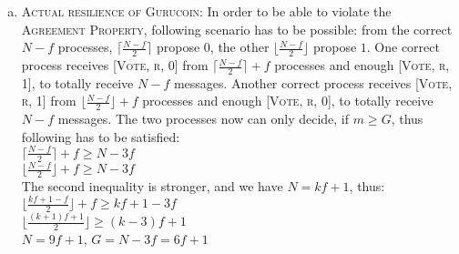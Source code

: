 \documentclass{article}
\begin{document}
\begin{enumerate}[a)]
        \item \textsc{Actual resilience of Gurucoin:}
        In order to be able to violate the \textsc{Agreement Property}, following scenario has to be possible:
        from the correct $N - f$ processes, $\lceil  \frac{N - f}{2} \rceil$ propose $0$, the other $\lfloor \frac{N - f}{2} \rfloor$ propose $1$.
        One correct process receives \textsc{[Vote, r, 0]} from $\lceil  \frac{N - f}{2} \rceil + f$ processes and enough \textsc{[Vote, r, 1]}, to totally receive $N - f$ messages.
        Another correct process receives \textsc{[Vote, r, 1]} from $\lfloor  \frac{N - f}{2} \rfloor + f$ processes and enough \textsc{[Vote, r, 0]}, to totally receive $N - f$ messages.
        The two processes now can only decide, if $m \geq G$, thus following has to be satisfied:\\
        $\lceil  \frac{N - f}{2} \rceil + f \geq N - 3f$\\
        $\lfloor  \frac{N - f}{2} \rfloor + f \geq N - 3f$\\
        The second inequality is stronger, and we have $N = kf + 1$, thus:\\
        $\lfloor  \frac{kf + 1 - f}{2} \rfloor + f \geq kf + 1 - 3f$\\
        $\lfloor  \frac{(k + 1)f + 1}{2} \rfloor \geq (k - 3)f + 1$\\

        $N = 9f + 1$, $G = N - 3f = 6f + 1$
        
    \end{enumerate}
    
    
\end{document}
